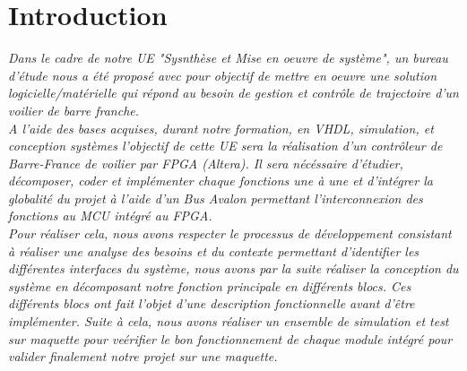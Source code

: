 \section*{Introduction}
\label{Introduction}

\textit{Dans le cadre de notre UE "Sysnthèse et Mise en oeuvre de système", un bureau d'étude nous a été proposé avec pour objectif de mettre en oeuvre une solution logicielle/matérielle qui répond au besoin de gestion et contrôle de trajectoire d'un voilier de barre franche.}\\

\textit{A l'aide des bases acquises, durant notre formation, en VHDL, simulation, et conception systèmes l'objectif de cette UE sera la réalisation d'un contrôleur de Barre-France de voilier par FPGA (Altera). Il sera nécéssaire d'étudier, décomposer, coder et implémenter chaque fonctions une à une et d'intégrer la globalité du projet à l'aide d'un Bus Avalon permettant l'interconnexion des fonctions au MCU intégré au FPGA.}\\

\textit{Pour réaliser cela, nous avons respecter le processus de développement consistant à réaliser une analyse  des besoins et du contexte permettant d'identifier les différentes interfaces du système, nous avons par la suite réaliser la conception du système en décomposant notre fonction principale en différents blocs. Ces différents blocs ont fait l'objet d'une description fonctionnelle avant d'être implémenter. Suite à cela, nous avons réaliser un ensemble de simulation et test sur maquette pour veérifier le bon fonctionnement de chaque module intégré pour valider finalement notre projet sur une maquette.}